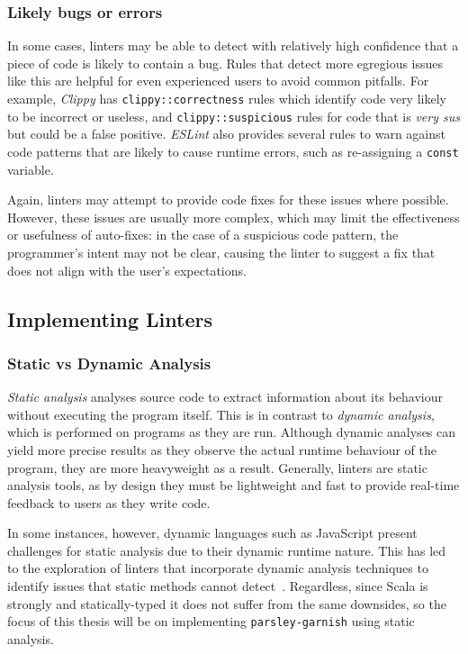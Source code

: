 \documentclass[../../main.tex]{subfiles}
\begin{document}
\subsubsection{Likely bugs or errors}
In some cases, linters may be able to detect with relatively high confidence that a piece of code is likely to contain a bug.
Rules that detect more egregious issues like this are helpful for even experienced users to avoid common pitfalls.
For example, \emph{Clippy} has \texttt{clippy::correctness} rules which identify code very likely to be incorrect or useless, and \texttt{clippy::suspicious} rules for code that is \emph{very sus} but could be a false positive.
\emph{ESLint} also provides several rules to warn against code patterns that are likely to cause runtime errors, such as re-assigning a \texttt{const} variable.

Again, linters may attempt to provide code fixes for these issues where possible.
However, these issues are usually more complex, which may limit the effectiveness or usefulness of auto-fixes: in the case of a suspicious code pattern, the programmer's intent may not be clear, causing the linter to suggest a fix that does not align with the user's expectations.

\subsection{Implementing Linters}
\subsubsection{Static vs Dynamic Analysis}
\emph{Static analysis} analyses source code to extract information about its behaviour without executing the program itself. 
This is in contrast to \emph{dynamic analysis}, which is performed on programs as they are run.
Although dynamic analyses can yield more precise results as they observe the actual runtime behaviour of the program, they are more heavyweight as a result.
Generally, linters are static analysis tools, as by design they must be lightweight and fast to provide real-time feedback to users as they write code.

In some instances, however, dynamic languages such as JavaScript present challenges for static analysis due to their dynamic runtime nature.
This has led to the exploration of linters that incorporate dynamic analysis techniques to identify issues that static methods cannot detect~\cite{gong_dlint_2015}.
Regardless, since Scala is strongly and statically-typed it does not suffer from the same downsides, so the focus of this thesis will be on implementing \texttt{parsley-garnish} using static analysis.
\end{document}
